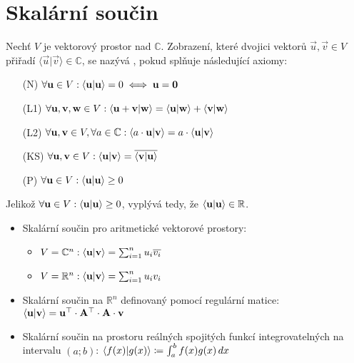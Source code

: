 \section{Skalární součin}

\begin{definition}
    Nechť $V$ je vektorový prostor nad $\mathbb{C}$. Zobrazení, které
    dvojici vektorů $\vec{u}, \vec{v} \in V$ přiřadí 
    $\langle\vec{u}|\vec{v}\rangle \in \mathbb{C}$, se nazývá 
    , pokud splňuje následující axiomy:
    \begin{itemize}
        \item[(N)] $\forall \mathbf{u} \in V: \langle \mathbf{u} | \mathbf{u}
            \rangle = 0 \iff \mathbf{u} = \mathbf{0}$
        \item[(L1)] $\forall \mathbf{u},\mathbf{v}, \mathbf{w} \in V:
            \langle \mathbf{u} + \mathbf{v} | \mathbf{w} \rangle = 
            \langle \mathbf{u} | \mathbf{w} \rangle + \langle \mathbf{v} | \mathbf{w} \rangle$
        \item[(L2)] $\forall \mathbf{u}, \mathbf{v} \in V, \forall a \in
            \mathbb{C}: \langle a\cdot\mathbf{u} | \mathbf{v} \rangle = a\cdot
            \langle \mathbf{u} | \mathbf{v} \rangle$
        \item[(KS)] $\forall \mathbf{u}, \mathbf{v} \in V: 
            \langle \mathbf{u} | \mathbf{v} \rangle = \overline{\langle \mathbf{v} | \mathbf{u} \rangle}$
        \item[(P)] $\forall \mathbf{u} \in V: \langle \mathbf{u} | \mathbf{u} \rangle 
            \geq 0$ 
    \end{itemize}
\end{definition}

\begin{remark}
    Jelikož $\forall \mathbf{u} \in V: \langle \mathbf{u} | \mathbf{u} \rangle \geq 0$, 
    vyplývá tedy, že $\langle \mathbf{u} | \mathbf{u} \rangle \in \mathbb{R}$.
\end{remark}

\begin{remark}
    \leavevmode
    \begin{itemize}
        \item Skalární součin pro aritmetické vektorové prostory:
            \begin{itemize}
                \item $V = \mathbb{C}^n: \langle \mathbf{u} | \mathbf{v} \rangle = 
                    \sum_{i=1}^n u_i \overline{v_i}$
                \item $V = \mathbb{R}^n: \langle \mathbf{u} | \mathbf{v} \rangle = 
                    \sum_{i=1}^n u_i v_i$
            \end{itemize}
        \item Skalární součin na $\mathbb{R}^n$ definovaný pomocí
            regulární matice: $\langle \mathbf{u} | \mathbf{v} \rangle = \mathbf{u}^\top
            \cdot \mathbf{A}^{\top} \cdot \mathbf{A} \cdot \mathbf{v}$
        \item Skalární součin na prostoru reálných spojitých funkcí
            integrovatelných na intervalu $(a;b)$: 
            $\langle f(x) | g(x) \rangle \coloneqq \int_a^b f(x)g(x) \,dx$
    \end{itemize}
\end{remark}

